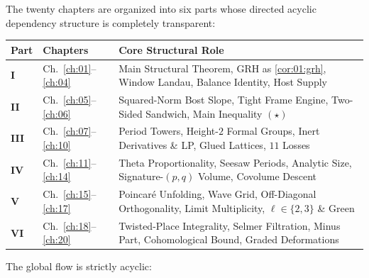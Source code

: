 The twenty chapters are organized into six parts whose directed acyclic dependency structure is completely transparent:
\begin{center}
\renewcommand{\arraystretch}{1.18}
\begin{tabular}{@{}lll@{}}
\toprule
\textbf{Part} & \textbf{Chapters} & \textbf{Core Structural Role} \\
\midrule
\textbf{I} & Ch.~\ref{ch:01}--\ref{ch:04} & Main Structural Theorem, GRH as \cref{cor:01:grh}, Window Landau, Balance Identity, Host Supply \\
\textbf{II} & Ch.~\ref{ch:05}--\ref{ch:06} & Squared-Norm Bost Slope, Tight Frame Engine, Two-Sided Sandwich, Main Inequality $(\star)$ \\
\textbf{III} & Ch.~\ref{ch:07}--\ref{ch:10} & Period Towers, Height-$2$ Formal Groups, Inert Derivatives \& LP, Glued Lattices, $11$ Losses \\
\textbf{IV} & Ch.~\ref{ch:11}--\ref{ch:14} & Theta Proportionality, Seesaw Periods, Analytic Size, Signature-$(p,q)$ Volume, Covolume Descent \\
\textbf{V} & Ch.~\ref{ch:15}--\ref{ch:17} & Poincar\'e Unfolding, Wave Grid, Off-Diagonal Orthogonality, Limit Multiplicity, $\ell\in\{2,3\}$ \& Green \\
\textbf{VI} & Ch.~\ref{ch:18}--\ref{ch:20} & Twisted-Place Integrality, Selmer Filtration, Minus Part, Cohomological Bound, Graded Deformations \\
\bottomrule
\end{tabular}
\end{center}
The global flow is strictly acyclic:
